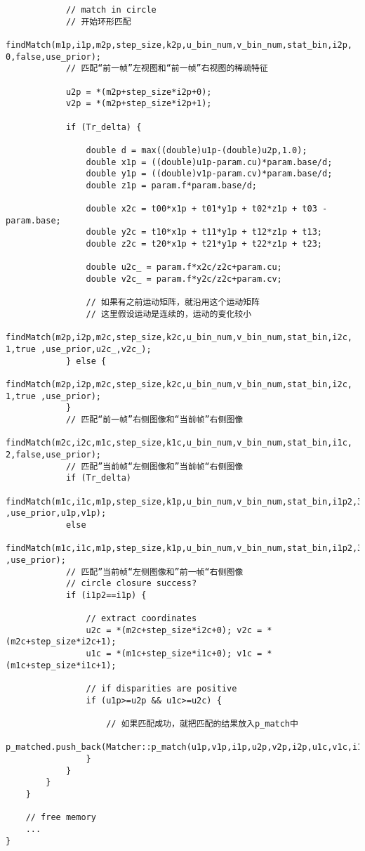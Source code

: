 \documentclass[UTF8]{ctexart}
\begin{document}
\begin{verbatim}
            // match in circle
            // 开始环形匹配
            findMatch(m1p,i1p,m2p,step_size,k2p,u_bin_num,v_bin_num,stat_bin,i2p, 0,false,use_prior);
            // 匹配“前一帧”左视图和“前一帧”右视图的稀疏特征

            u2p = *(m2p+step_size*i2p+0);
            v2p = *(m2p+step_size*i2p+1);

            if (Tr_delta) {
            
                double d = max((double)u1p-(double)u2p,1.0);
                double x1p = ((double)u1p-param.cu)*param.base/d;
                double y1p = ((double)v1p-param.cv)*param.base/d;
                double z1p = param.f*param.base/d;

                double x2c = t00*x1p + t01*y1p + t02*z1p + t03 - param.base;
                double y2c = t10*x1p + t11*y1p + t12*z1p + t13;
                double z2c = t20*x1p + t21*y1p + t22*z1p + t23;

                double u2c_ = param.f*x2c/z2c+param.cu;
                double v2c_ = param.f*y2c/z2c+param.cv;

                // 如果有之前运动矩阵，就沿用这个运动矩阵
                // 这里假设运动是连续的，运动的变化较小
                findMatch(m2p,i2p,m2c,step_size,k2c,u_bin_num,v_bin_num,stat_bin,i2c, 1,true ,use_prior,u2c_,v2c_);
            } else {
                findMatch(m2p,i2p,m2c,step_size,k2c,u_bin_num,v_bin_num,stat_bin,i2c, 1,true ,use_prior);
            }
            // 匹配“前一帧”右侧图像和“当前帧”右侧图像
            findMatch(m2c,i2c,m1c,step_size,k1c,u_bin_num,v_bin_num,stat_bin,i1c, 2,false,use_prior);
            // 匹配”当前帧“左侧图像和”当前帧“右侧图像
            if (Tr_delta)
                findMatch(m1c,i1c,m1p,step_size,k1p,u_bin_num,v_bin_num,stat_bin,i1p2,3,true ,use_prior,u1p,v1p);
            else
                findMatch(m1c,i1c,m1p,step_size,k1p,u_bin_num,v_bin_num,stat_bin,i1p2,3,true ,use_prior);
            // 匹配”当前帧“左侧图像和”前一帧“右侧图像
            // circle closure success?
            if (i1p2==i1p) {

                // extract coordinates
                u2c = *(m2c+step_size*i2c+0); v2c = *(m2c+step_size*i2c+1);
                u1c = *(m1c+step_size*i1c+0); v1c = *(m1c+step_size*i1c+1);

                // if disparities are positive
                if (u1p>=u2p && u1c>=u2c) {
                
                    // 如果匹配成功，就把匹配的结果放入p_match中
                    p_matched.push_back(Matcher::p_match(u1p,v1p,i1p,u2p,v2p,i2p,u1c,v1c,i1c,u2c,v2c,i2c));
                }
            }
        }
    }

    // free memory
    ...
}
    \end{verbatim}
\end{document}
